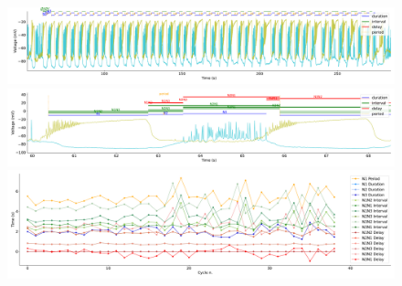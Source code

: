 \begin{figure}[htbp]
	\centering
	\begin{minipage}[b]{\textwidth}
		\centering
		\includegraphics[width=\textwidth,height=0.1\textheight]{./invariants/data/SUSSEX/CV1a_driven1/images/stim_cv1a1_3phases_signal_intervals_zoom.pdf}
		\includegraphics[width=\textwidth]{./invariants/data/SUSSEX/CV1a_driven1/images/stim_cv1a1_3phases_signal_intervals_cycle.pdf}
		\includegraphics[width=\textwidth]{./invariants/data/SUSSEX/CV1a_driven1/images/stim_cv1a1_3phases_time_cycle.pdf}
	\end{minipage}
	\begin{minipage}{0.9\textwidth}
		\centering
		\begin{minipage}[b]{0.45\textwidth}
			\centering

\end{minipage}
\end{minipage}
\end{figure}
